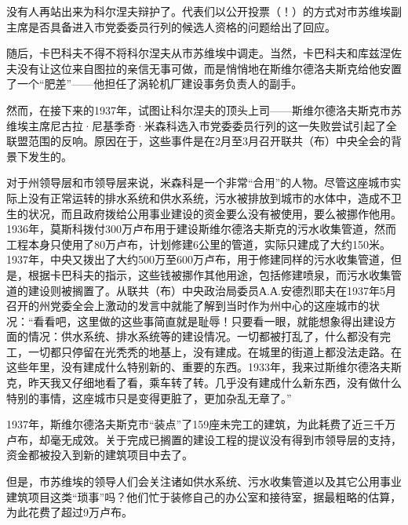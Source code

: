 没有人再站出来为科尔涅夫辩护了。代表们以公开投票（！）的方式对市苏维埃副主席是否具备进入市党委委员行列的候选人资格的问题给出了回应。

随后，卡巴科夫不得不将科尔涅夫从市苏维埃中调走。当然，卡巴科夫和库兹涅佐夫没有让这位来自图拉的亲信无事可做，而是悄悄地在斯维尔德洛夫斯克给他安置了一个“肥差”——他担任了涡轮机厂建设事务负责人的副手。

然而，在接下来的1937年，试图让科尔涅夫的顶头上司——斯维尔德洛夫斯克市苏维埃主席尼古拉·尼基季奇·米森科选入市党委委员行列的这一失败尝试引起了全联盟范围的反响。原因在于，这些事件是在2月至3月召开联共（布）中央全会的背景下发生的。

对于州领导层和市领导层来说，米森科是一个非常“合用”的人物。尽管这座城市实际上没有正常运转的排水系统和供水系统，污水被排放到城市的水体中，造成不卫生的状况，而且政府拨给公用事业建设的资金要么没有被使用，要么被挪作他用。1936年，莫斯科拨付300万卢布用于建设斯维尔德洛夫斯克的污水收集管道，然而工程本身只使用了80万卢布，计划修建6公里的管道，实际只建成了大约150米。1937年，中央又拨出了大约500万至600万卢布，用于修建同样的污水收集管道，但是，根据卡巴科夫的指示，这些钱被挪作其他用途，包括修建喷泉，而污水收集管道的建设则被搁置了。从联共（布）中央政治局委员А.А.安德烈耶夫在1937年5月召开的州党委全会上激动的发言中就能了解到当时作为州中心的这座城市的状况：“看看吧，这里做的这些事简直就是耻辱！只要看一眼，就能想象得出建设方面的情况：供水系统、排水系统等的建设情况。一切都被打乱了，什么都没有完工，一切都只停留在光秃秃的地基上，没有建成。在城里的街道上都没法走路。在这些年里，没有建成什么特别新的、重要的东西。1933年，我来过斯维尔德洛夫斯克，昨天我又仔细地看了看，乘车转了转。几乎没有建成什么新东西，没有做什么特别的事情，这座城市只是变得更脏了，更加杂乱无章了。”

1937年，斯维尔德洛夫斯克市“装点”了159座未完工的建筑，为此耗费了近三千万卢布，却毫无成效。关于完成已搁置的建设工程的提议没有得到市领导层的支持，资金都被投入到新的建筑项目中去了。

但是，市苏维埃的领导人们会关注诸如供水系统、污水收集管道以及其它公用事业建筑项目这类“琐事”吗？他们忙于装修自己的办公室和接待室，据最粗略的估算，为此花费了超过9万卢布。

